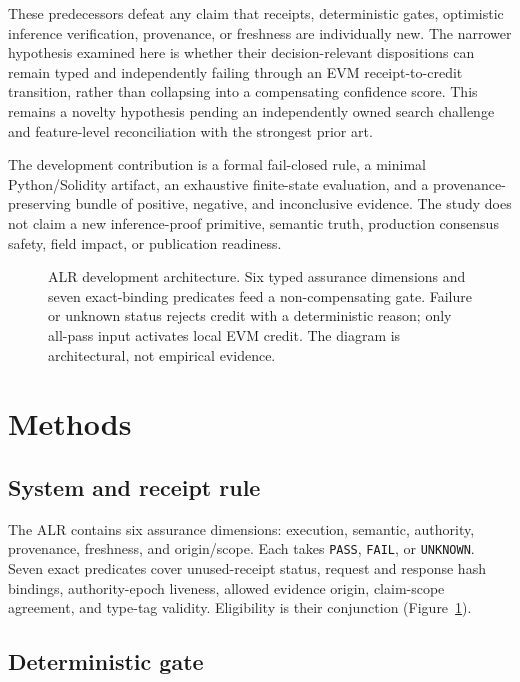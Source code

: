 \documentclass[10pt]{article}
\begin{document}
These predecessors defeat any claim that receipts, deterministic gates, optimistic
inference verification, provenance, or freshness are individually new. The narrower
hypothesis examined here is whether their decision-relevant dispositions can remain
typed and independently failing through an EVM receipt-to-credit transition, rather
than collapsing into a compensating confidence score. This remains a novelty
hypothesis pending an independently owned search challenge and feature-level
reconciliation with the strongest prior art.

The development contribution is a formal fail-closed rule, a minimal
Python/Solidity artifact, an exhaustive finite-state evaluation, and a
provenance-preserving bundle of positive, negative, and inconclusive evidence. The
study does not claim a new inference-proof primitive, semantic truth, production
consensus safety, field impact, or publication readiness.

\begin{figure}[t]
\centering
\resizebox{\linewidth}{!}{}
\caption{ALR development architecture. Six typed assurance dimensions and seven
exact-binding predicates feed a non-compensating gate. Failure or unknown status
rejects credit with a deterministic reason; only all-pass input activates local EVM
credit. The diagram is architectural, not empirical evidence.}
\label{fig:architecture}
\end{figure}

\section{Methods}

\subsection{System and receipt rule}

The ALR contains six assurance dimensions: execution, semantic, authority,
provenance, freshness, and origin/scope. Each takes \texttt{PASS}, \texttt{FAIL}, or
\texttt{UNKNOWN}. Seven exact predicates cover unused-receipt status, request and
response hash bindings, authority-epoch liveness, allowed evidence origin,
claim-scope agreement, and type-tag validity. Eligibility is their conjunction
(Figure~\ref{fig:architecture}).

\subsection{Deterministic gate}
\end{document}

